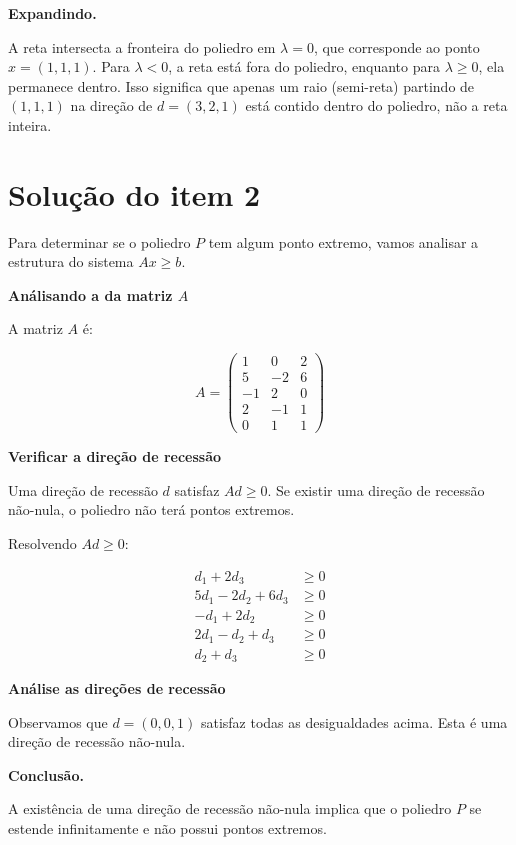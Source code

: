\documentclass{article}
\begin{document}
\textbf{Expandindo.}

A reta intersecta a fronteira do poliedro em $\lambda = 0$, que corresponde ao ponto $x = (1,1,1)$. Para $\lambda < 0$, a reta está fora do poliedro, enquanto para $\lambda \geq 0$, ela permanece dentro. Isso significa que apenas um raio (semi-reta) partindo de $(1,1,1)$ na direção de $d = (3,2,1)$ está contido dentro do poliedro, não a reta inteira.

\section*{Solução do item 2}

Para determinar se o poliedro $P$ tem algum ponto extremo, vamos analisar a estrutura do sistema $Ax \geq b$.

\textbf{Análisando a da matriz $A$}

A matriz $A$ é:

$$
A = \begin{pmatrix}
1 & 0 & 2 \\
5 & -2 & 6 \\
-1 & 2 & 0 \\
2 & -1 & 1 \\
0 & 1 & 1
\end{pmatrix}
$$

\textbf{Verificar a direção de recessão}

Uma direção de recessão $d$ satisfaz $Ad \geq 0$. Se existir uma direção de recessão não-nula, o poliedro não terá pontos extremos.

Resolvendo $Ad \geq 0$:

\begin{align*}
d_1 + 2d_3 &\geq 0 \\
5d_1 - 2d_2 + 6d_3 &\geq 0 \\
-d_1 + 2d_2 &\geq 0 \\
2d_1 - d_2 + d_3 &\geq 0 \\
d_2 + d_3 &\geq 0
\end{align*}

\textbf{Análise as direções de recessão}

Observamos que $d = (0, 0, 1)$ satisfaz todas as desigualdades acima. Esta é uma direção de recessão não-nula.

\textbf{Conclusão.}

A existência de uma direção de recessão não-nula implica que o poliedro $P$ se estende infinitamente e não possui pontos extremos.
\end{document}
